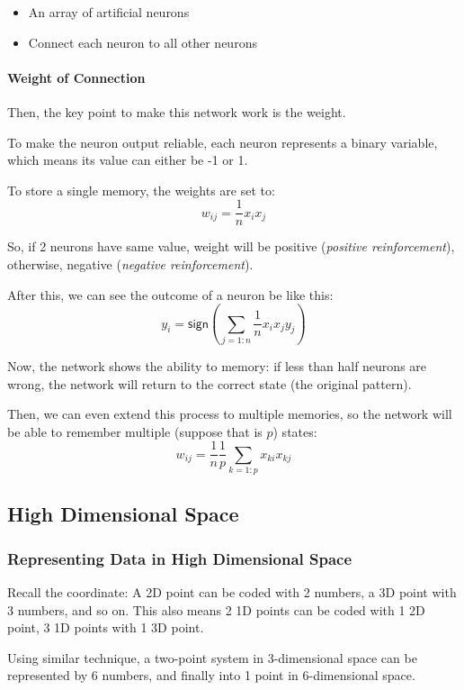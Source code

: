 \documentclass[a4paper, openany]{book}
\begin{document}
\begin{itemize}
  \item An array of artificial neurons
  \item Connect each neuron to all other neurons
\end{itemize}

\paragraph{Weight of Connection}

Then, the key point to make this network work is the weight.

To make the neuron output reliable, each neuron represents a binary variable, which means its value can either be -1 or 1.

To store a single memory, the weights are set to:
$$w_{ij} = \frac{1}{n} x_i x_j$$

So, if 2 neurons have same value, weight will be positive (\textit{positive reinforcement}), otherwise, negative (\textit{negative reinforcement}).

After this, we can see the outcome of a neuron be like this:
$$y_i = \mathsf{sign} (\sum_{j=1:n} \frac{1}{n} x_i x_j y_j)$$

Now, the network shows the ability to memory: if less than half neurons are wrong, the network will return to the correct state (the original pattern).

Then, we can even extend this process to multiple memories, so the network will be able to remember multiple (suppose that is $p$) states:
$$w_{ij} = \frac{1}{n} \frac{1}{p} \sum_{k = 1:p} x_{ki} x_{kj}$$

\subsection{High Dimensional Space}

\subsubsection{Representing Data in High Dimensional Space}\label{sec:RepresentingDataInHighDimensionalSpace}

Recall the coordinate: A 2D point can be coded with 2 numbers, a 3D point with 3 numbers, and so on. This also means 2 1D points can be coded with 1 2D point, 3 1D points with 1 3D point.

Using similar technique, a two-point system in 3-dimensional space can be represented by 6 numbers, and finally into 1 point in 6-dimensional space.
\end{document}
